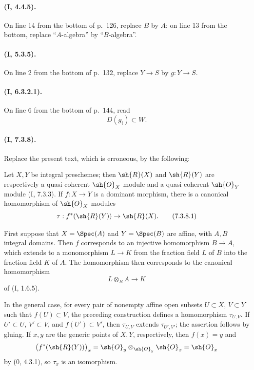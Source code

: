 \paragraph{(I, 4.4.5).}
On line 14 from the bottom of p.~126, replace $B$ by $A$; on line 13
from the bottom, replace ``$A$-algebra'' by ``$B$-algebra''.

\paragraph{(I, 5.3.5).}
On line 2 from the bottom of p.~132, replace $Y\to S$ by
$g:Y\to S$.

\paragraph{(I, 6.3.2.1).}
On line 6 from the bottom of p.~144, read
\[
  D(g_i)\subset W.
\]

\paragraph{(I, 7.3.8).}
Replace the present text, which is erroneous, by the following:

Let $X,Y$ be integral preschemes; then $\sh{R}(X)$ and $\sh{R}(Y)$
are respectively a quasi-coherent $\sh{O}_X$-module and a
quasi-coherent $\sh{O}_Y$-module (I, 7.3.3).  If
$f:X\to Y$ is a dominant morphism, there is a canonical homomorphism
of $\sh{O}_X$-modules
\begin{equation}
\label{ega2:addendum:I.7.3.8.1}
  \tau:f^*(\sh{R}(Y))\to\sh{R}(X).
\tag{7.3.8.1}
\end{equation}

First suppose that $X=\Spec(A)$ and $Y=\Spec(B)$ are affine, with
$A,B$ integral domains.  Then $f$ corresponds to an injective
homomorphism $B\to A$, which extends to a monomorphism
$L\to K$ from the fraction field $L$ of $B$ into the fraction field
$K$ of $A$.  The homomorphism  then corresponds to the
canonical homomorphism
\[
  L\otimes_B A\to K
\]
of (I, 1.6.5).

In the general case, for every pair of nonempty affine open subsets
$U\subset X$, $V\subset Y$ such that $f(U)\subset V$, the preceding
construction defines a homomorphism $\tau_{U,V}$.  If
$U'\subset U$, $V'\subset V$, and $f(U')\subset V'$, then
$\tau_{U,V}$ extends $\tau_{U',V'}$; the assertion follows by gluing.
If $x,y$ are the generic points of $X,Y$, respectively, then
$f(x)=y$ and
\[
  \bigl(f^*(\sh{R}(Y))\bigr)_x
  =\sh{O}_y\otimes_{\sh{O}_y}\sh{O}_x
  =\sh{O}_x
\]
by (0, 4.3.1), so $\tau_x$ is an isomorphism.

